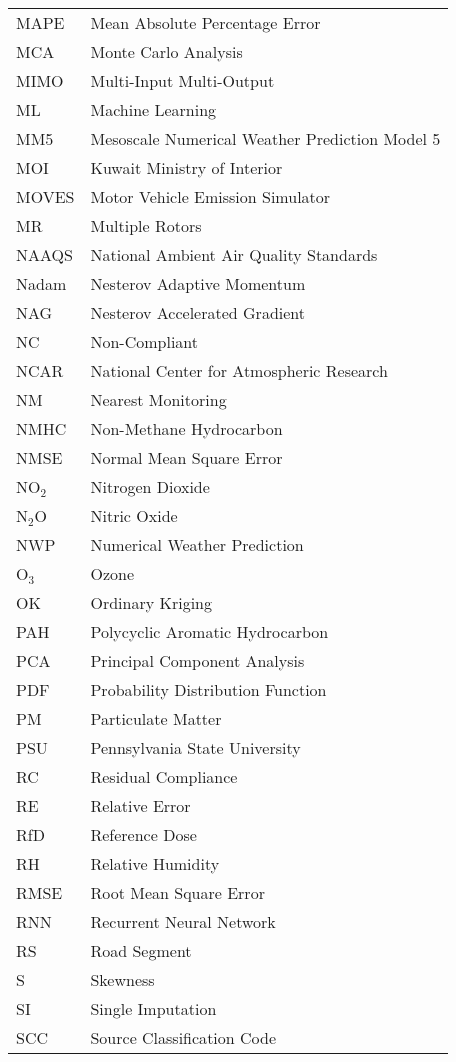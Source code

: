 \begin{longtable}{ll}
MAPE & Mean Absolute Percentage Error \\
MCA & Monte Carlo Analysis \\
MIMO & Multi-Input Multi-Output \\
ML & Machine Learning \\
MM5 & Mesoscale Numerical Weather Prediction Model 5 \\
MOI & Kuwait Ministry of Interior \\
MOVES & Motor Vehicle Emission Simulator \\
MR & Multiple Rotors \\
NAAQS & National Ambient Air Quality Standards \\
Nadam & Nesterov Adaptive Momentum \\
NAG & Nesterov Accelerated Gradient \\
NC & Non-Compliant \\
NCAR & National Center for Atmospheric Research \\
NM & Nearest Monitoring \\
NMHC & Non-Methane Hydrocarbon \\
NMSE & Normal Mean Square Error \\
NO$_{2}$ & Nitrogen Dioxide \\
N$_{2}$O & Nitric Oxide \\
NWP & Numerical Weather Prediction \\
O$_{3}$ & Ozone \\
OK & Ordinary Kriging \\
PAH & Polycyclic Aromatic Hydrocarbon \\
PCA & Principal Component Analysis \\
PDF & Probability Distribution Function \\
PM & Particulate Matter \\
PSU & Pennsylvania State University \\
RC & Residual Compliance \\
RE & Relative Error \\
RfD & Reference Dose \\
RH & Relative Humidity \\
RMSE & Root Mean Square Error \\
RNN & Recurrent Neural Network \\
RS & Road Segment \\
S & Skewness \\
SI & Single Imputation \\
SCC & Source Classification Code \\

\end{longtable}
